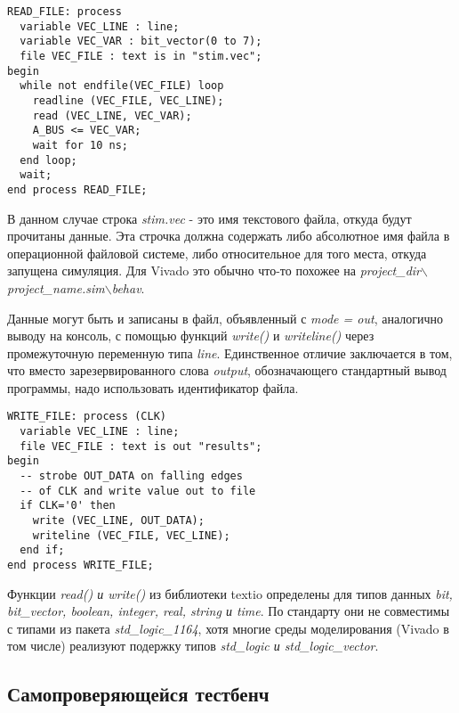 \begin{Code}
\begin{lstlisting}
READ_FILE: process
  variable VEC_LINE : line;
  variable VEC_VAR : bit_vector(0 to 7);
  file VEC_FILE : text is in "stim.vec";
begin
  while not endfile(VEC_FILE) loop
    readline (VEC_FILE, VEC_LINE);
    read (VEC_LINE, VEC_VAR);
    A_BUS <= VEC_VAR;
    wait for 10 ns;
  end loop;
  wait;
end process READ_FILE;
\end{lstlisting}
\end{Code}

В данном случае строка \emph{stim.vec} - это имя текстового файла, откуда будут прочитаны данные. Эта строчка должна содержать либо абсолютное имя файла в операционной файловой системе, либо относительное для того места, откуда запущена симуляция. Для Vivado это обычно что-то похожее на \emph{project\_dir$\backslash$project\_name.sim$\backslash$behav}.

Данные могут быть и записаны в файл, объявленный с \emph{mode = out}, аналогично выводу на консоль, с помощью функций \emph{write()} и \emph{writeline()} через промежуточную переменную типа \emph{line}. Единственное отличие заключается в том, что вместо зарезервированного слова \emph{output}, обозначающего стандартный вывод программы, надо использовать идентификатор файла. 

\begin{Code}
\begin{lstlisting}
WRITE_FILE: process (CLK)
  variable VEC_LINE : line;
  file VEC_FILE : text is out "results";
begin
  -- strobe OUT_DATA on falling edges 
  -- of CLK and write value out to file
  if CLK='0' then
    write (VEC_LINE, OUT_DATA);
    writeline (VEC_FILE, VEC_LINE);
  end if; 
end process WRITE_FILE;
\end{lstlisting}
\end{Code}

Функции \emph{read() и write()} из библиотеки textio определены для типов данных \emph{bit, bit\_vector, boolean, integer, real, string и time}. По стандарту они не совместимы с типами из пакета \emph{std\_logic\_1164}, хотя многие среды моделирования (Vivado в том числе) реализуют подержку типов \emph{std\_logic и std\_logic\_vector}. 


\subsection{Самопроверяющейся тестбенч}



